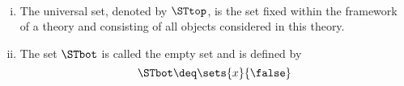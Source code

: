 \begin{definition}
\label{def:universeempty}~ 
	\begin{enumerate}[(i)]
		\item The universal set, denoted by $\STtop$, is the set fixed within the framework of a theory and consisting of all objects considered in this theory.
		\item The set $\STbot$ is called the empty set and is defined by
			\begin{equation*}
				\STbot \deq \sets{x}{\false}
			\end{equation*}
	\end{enumerate}
\end{definition}